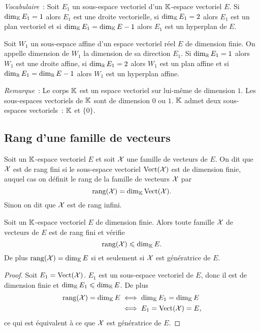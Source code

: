 \emph{Vocabulaire}~: Soit \(E_1\) un sous-espace vectoriel d'un \(\mathbb{K}\)-espace
vectoriel \(E\). Si \(\operatorname{dim}_{\mathbb{K}} E_1=1\) alors \(E_1\) est une droite vectorielle,
si \(\operatorname{dim}_{\mathbb{K}} E_1=2\) alors \(E_1\) est un plan vectoriel et si \(\operatorname{dim}_{\mathbb{K}} E_1 =
\operatorname{dim}_{\mathbb{K}} E -1\) alors \(E_1\) est un hyperplan de \(E\).

\begin{defdef}
  Soit \(W_1\) un sous-espace affine d'un espace vectoriel réel \(E\) de
  dimension finie. On appelle dimension de \(W_1\) la dimension de sa direction
  \(E_1\). Si \(\operatorname{dim}_{\mathbb{R}} E_1=1\) alors \(W_1\) est une droite affine, si
  \(\operatorname{dim}_{\mathbb{R}} E_1=2\) alors \(W_1\) est un plan affine et si \(\operatorname{dim}_{\mathbb{R}} E_1=\operatorname{dim}_{\mathbb{R}}
  E -1 \) alors \(W_1\) est un hyperplan affine.
\end{defdef}

\emph{Remarque}~: Le corps \(\mathbb{K}\) est un espace vectoriel sur lui-même de
dimension \(1\). Les sous-espaces vectoriels de \(\mathbb{K}\) sont de dimension \(0\)
ou \(1\). \(\mathbb{K}\) admet deux sous-espaces vectoriels~: \(\mathbb{K}\) et \(\{0\}\).

\subsection{Rang d'une famille de vecteurs}

\begin{defdef}
  Soit un \(\mathbb{K}\)-espace vectoriel \(E\) et soit \(\mathcal{X}\) une famille de vecteurs
  de \(E\). On dit que \(\mathcal{X}\) est de rang fini si le sous-espace vectoriel
  \(\operatorname{Vect}(\mathcal{X})\) est de dimension finie, auquel cas on définit le rang de
  la famille de vecteurs \(\mathcal{X}\) par
  \begin{equation}
    \operatorname{rang}(\mathcal{X})=\operatorname{dim}_{\mathbb{K}} \operatorname{Vect}(\mathcal{X}).
  \end{equation}
  Sinon on dit que \(\mathcal{X}\) est de rang infini.
\end{defdef}

\begin{prop}
  Soit un \(\mathbb{K}\)-espace vectoriel \(E\) de dimension finie. Alors toute famille
  \(\mathcal{X}\) de vecteurs de \(E\) est de rang fini et vérifie
  \begin{equation}
    \operatorname{rang}(\mathcal{X}) \leqslant \operatorname{dim}_{\mathbb{K}} E.
  \end{equation}
  De plus \(\operatorname{rang}(\mathcal{X}) = \operatorname{dim}_{\mathbb{K}} E\) si et seulement si \(\mathcal{X}\) est génératrice de
  \(E\).
\end{prop}
\begin{proof}
  Soit \(E_1=\operatorname{Vect}(\mathcal{X})\). \(E_1\) est un sous-espace vectoriel de \(E\),
  donc il est de dimension finie et \(\operatorname{dim}_{\mathbb{K}} E_1 \leqslant \operatorname{dim}_{\mathbb{K}} E\). De plus
  \begin{align}
    \operatorname{rang}(\mathcal{X}) = \operatorname{dim}_{\mathbb{K}} E &\iff \operatorname{dim}_{\mathbb{K}} E_1 = \operatorname{dim}_{\mathbb{K}} E\\
    & \iff E_1=\operatorname{Vect}(\mathcal{X})=E,
  \end{align}
  ce qui est équivalent à ce que \(\mathcal{X}\) est génératrice de \(E\).
\end{proof}

